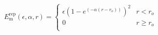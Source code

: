 \documentclass[12pt]{article}
\begin{document}
$$
 E_\text{m}^{\text{rep}}(\epsilon,\alpha,r) =
  \begin{cases}
  \epsilon\left( 1 - e^{ \left(-\alpha(r-r_o) \right)}\right)^2 & r < r_{o} \\
  0 & r \geq r_{o}\\
   \end{cases} 
$$
\end{document}
